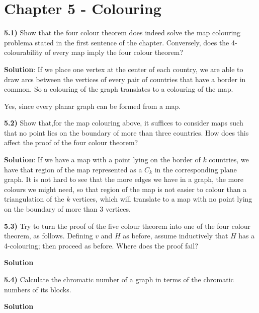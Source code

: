 \documentclass[11pt]{article}
\theoremstyle{plain}
\begin{document}
\section*{Chapter 5 - Colouring}

\textbf{5.1)} Show that the four colour theorem does indeed solve the map colouring problema stated in the first sentence of the chapter. Conversely, does the 4-colourability of every map imply the four colour theorem?

\vspace{.4cm}
\noindent \textbf{Solution}: If we place one vertex at the center of each country, we are able to draw arcs between the vertices of every pair of countries that have a border in common. So a colouring of the graph translates to a colouring of the map.

Yes, since every planar graph can be formed from a map.

\vspace{.4cm}
\textbf{5.2)} Show that,for the map colouring above, it suffices to consider maps such that no point lies on the boundary of more than three countries. How does this affect the proof of the four colour theorem?

\vspace{.4cm}
\noindent \textbf{Solution}: If we have a map with a point lying on the border of $k$ countries, we have that region of the map represented as a $C_k$ in the corresponding plane graph. It is not hard to see that the more edges we have in a graph, the more colours we might need, so that region of the map is not easier to colour than a triangulation of the $k$ vertices, which will translate to a map with no point lying on the boundary of more than 3 vertices.

\vspace{.4cm}
\textbf{5.3)} Try to turn the proof of the five colour theorem into one of the four colour theorem, as follows. Defining $v$ and $H$ as before, assume inductively that $H$ has a 4-colouring; then proceed as before. Where does the proof fail?

\vspace{.4cm}
\noindent \textbf{Solution}

\vspace{.4cm}
\textbf{5.4)} Calculate the chromatic number of a graph in terms of the chromatic numbers of its blocks.

\vspace{.4cm}
\noindent \textbf{Solution}
\end{document}
